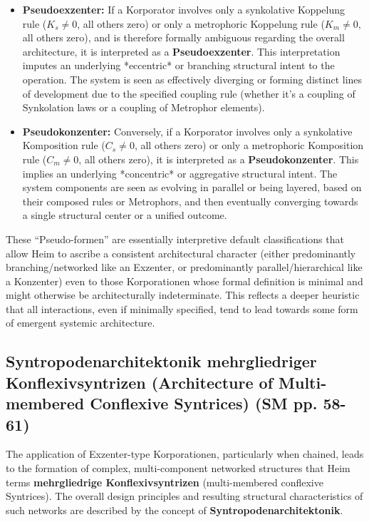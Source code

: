 \documentclass[
    12pt,              %
    a4paper,           %
    headings=normal,   %
    twoside=true,      %
    BCOR=8mm,          %
]{scrbook}
\newcommand{\q}[1]{\enquote{#1}}
\begin{document}
\begin{itemize}
    \item   \textbf{Pseudoexzenter:} If a Korporator involves only a synkolative Koppelung rule (\(K_s \neq 0\), all others zero) or only a metrophoric Koppelung rule (\(K_m \neq 0\), all others zero), and is therefore formally ambiguous regarding the overall architecture, it is interpreted as a \textbf{Pseudoexzenter}. This interpretation imputes an underlying *eccentric* or branching structural intent to the operation. The system is seen as effectively diverging or forming distinct lines of development due to the specified coupling rule (whether it's a coupling of Synkolation laws or a coupling of Metrophor elements).
    \item   \textbf{Pseudokonzenter:} Conversely, if a Korporator involves only a synkolative Komposition rule (\(C_s \neq 0\), all others zero) or only a metrophoric Komposition rule (\(C_m \neq 0\), all others zero), it is interpreted as a \textbf{Pseudokonzenter}. This implies an underlying *concentric* or aggregative structural intent. The system components are seen as evolving in parallel or being layered, based on their composed rules or Metrophors, and then eventually converging towards a single structural center or a unified outcome.
\end{itemize}
These \q{Pseudo-formen} are essentially interpretive default classifications that allow Heim to ascribe a consistent architectural character (either predominantly branching/networked like an Exzenter, or predominantly parallel/hierarchical like a Konzenter) even to those Korporationen whose formal definition is minimal and might otherwise be architecturally indeterminate. This reflects a deeper heuristic that all interactions, even if minimally specified, tend to lead towards some form of emergent systemic architecture.

\subsection{Syntropodenarchitektonik mehrgliedriger Konflexivsyntrizen (Architecture of Multi-membered Conflexive Syntrices) (SM pp. 58-61)}
\label{sec:ch3_syntropodenarchitektonik_original_2} 

The application of Exzenter-type Korporationen, particularly when chained, leads to the formation of complex, multi-component networked structures that Heim terms \textbf{mehrgliedrige Konflexivsyntrizen} (multi-membered conflexive Syntrices). The overall design principles and resulting structural characteristics of such networks are described by the concept of \textbf{Syntropodenarchitektonik}.
\end{document}
